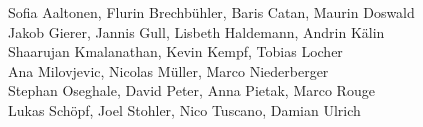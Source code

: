 %
%
%
Sofia Aaltonen,		%
Flurin Brechbühler,	%
Baris Catan,		%
Maurin Doswald%
\\
Jakob Gierer,		%
Jannis Gull,		%
Lisbeth Haldemann,	%
Andrin Kälin%
\\
Shaarujan Kmalanathan,	%
Kevin Kempf,		%
Tobias Locher%
\\
Ana Milovjevic,		%
Nicolas Müller,		%
Marco Niederberger%
\\
Stephan Oseghale,	%
David Peter,		%
Anna Pietak,		%
Marco Rouge%
\\
Lukas Schöpf,		%
Joel Stohler,		%
Nico Tuscano,		%
Damian Ulrich%
